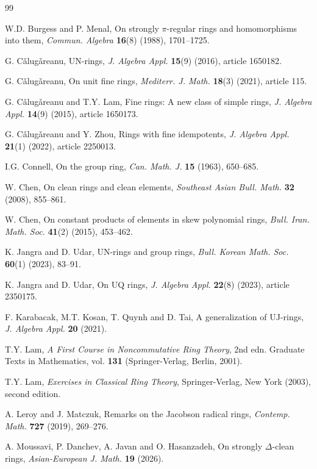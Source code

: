 \documentclass[11pt]{amsart}
\theoremstyle{definition}
\begin{document}
\begin{thebibliography}{99}
	
W.D. Burgess and P. Menal, On strongly $\pi$-regular rings and homomorphisms into them, \textit{Commun. Algebra} {\bf 16}(8) (1988), 1701--1725.

G. C\v{a}lug\v{a}reanu, UN-rings, \textit{J. Algebra Appl.} {\bf 15}(9) (2016), article 1650182.
	
G. C\v{a}lug\v{a}reanu, On unit fine rings, \textit{Mediterr. J. Math.} {\bf 18}(3) (2021), article 115.

G. C\v{a}lug\v{a}reanu and T.Y. Lam, Fine rings: A new class of simple rings, \textit{J. Algebra Appl.} {\bf 14}(9) (2015), article 1650173.

G. C\v{a}lug\v{a}reanu and Y. Zhou, Rings with fine idempotents, \textit{J. Algebra Appl.} {\bf 21}(1) (2022), article 2250013.

I.G. Connell, On the group ring, \textit{Can. Math. J.} {\bf 15} (1963), 650--685.

W. Chen, On clean rings and clean elements, \textit{Southeast Asian Bull. Math.} {\bf 32} (2008), 855--861.

W. Chen, On constant products of elements in skew polynomial rings, \textit{Bull. Iran. Math. Soc.} {\bf 41}(2) (2015), 453--462.

K. Jangra and D. Udar, UN-rings and group rings, \textit{Bull. Korean Math. Soc.} {\bf 60}(1) (2023), 83--91.

K. Jangra and D. Udar, On UQ rings, \textit{J. Algebra Appl.} {\bf 22}(8) (2023), article 2350175.

F. Karabacak, M.T. Kosan, T. Quynh and D. Tai, A generalization of UJ-rings, \textit{J. Algebra Appl.} {\bf 20} (2021).

T.Y. Lam, \textit{A First Course in Noncommutative Ring Theory}, 2nd edn. Graduate Texts in Mathematics, vol. {\bf 131} (Springer-Verlag, Berlin, 2001).

T.Y. Lam, \textit{Exercises in Classical Ring Theory}, Springer-Verlag, New York (2003), second edition.

A. Leroy and J. Matczuk, Remarks on the Jacobson radical rings, \textit{Contemp. Math.} {\bf 727} (2019), 269--276.

A. Moussavi, P. Danchev, A. Javan and O. Hasanzadeh, On strongly $\Delta$-clean rings, \textit{Asian-European J. Math.} {\bf 19} (2026).


\end{thebibliography}
\end{document}
